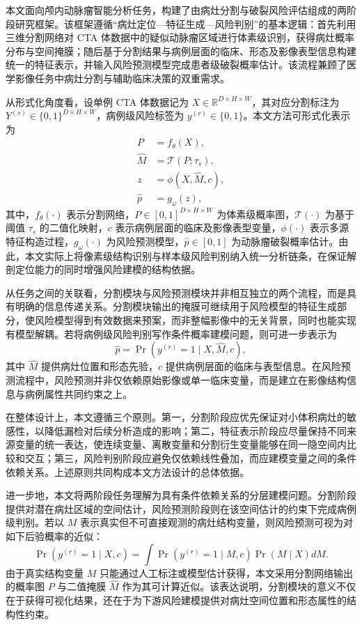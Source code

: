 
本文面向颅内动脉瘤智能分析任务，构建了由病灶分割与破裂风险评估组成的两阶段研究框架。该框架遵循“病灶定位—特征生成—风险判别”的基本逻辑：首先利用三维分割网络对 CTA 体数据中的疑似动脉瘤区域进行体素级识别，获得病灶概率分布与空间掩膜；随后基于分割结果与病例层面的临床、形态及影像表型信息构建统一的特征表示，并输入风险预测模型完成患者级破裂概率估计。该流程兼顾了医学影像任务中病灶分割与辅助临床决策的双重需求。

从形式化角度看，设单例 CTA 体数据记为 $X\in\mathbb{R}^{D\times H\times W}$，其对应分割标注为 $Y^{(s)}\in\{0,1\}^{D\times H\times W}$，病例级风险标签为 $y^{(r)}\in\{0,1\}$。本文方法可形式化表示为
\begin{align}
P &= f_{\theta}(X),\\
\hat{M} &= \mathcal{T}(P;\tau_s),\\
z &= \phi(X,\hat{M},c),\\
\hat{p} &= g_{\omega}(z),
\end{align}
其中，$f_{\theta}(\cdot)$ 表示分割网络，$P\in[0,1]^{D\times H\times W}$ 为体素级概率图，$\mathcal{T}(\cdot)$ 为基于阈值 $\tau_s$ 的二值化映射，$c$ 表示病例层面的临床及影像表型变量，$\phi(\cdot)$ 表示多源特征构造过程，$g_{\omega}(\cdot)$ 为风险预测模型，$\hat{p}\in[0,1]$ 为动脉瘤破裂概率估计。由此，本文实际上将像素级结构识别与样本级风险判别纳入统一分析链条，在保证解剖定位能力的同时增强风险建模的结构依据。

从任务之间的关联看，分割模块与风险预测模块并非相互独立的两个流程，而是具有明确的信息传递关系。分割模块输出的掩膜可继续用于风险模型的特征生成部分，使风险模型得到有效数据来预案，而非整幅影像中的无关背景，同时也能实现有模型解耦。若将病例级风险判别写作条件概率建模问题，则可进一步表示为
\begin{equation}
\hat{p}=\Pr\left(y^{(r)}=1\mid X,\hat{M},c\right),
\end{equation}
其中 $\hat{M}$ 提供病灶位置和形态先验，$c$ 提供病例层面的临床与表型信息。在风险预测流程中，风险预测并非仅依赖原始影像或单一临床变量，而是建立在影像结构信息与病例属性共同约束之上。

在整体设计上，本文遵循三个原则。第一，分割阶段应优先保证对小体积病灶的敏感性，以降低漏检对后续分析造成的影响；第二，特征表示阶段应尽量保持不同来源变量的统一表达，使连续变量、离散变量和分割衍生变量能够在同一隐空间内比较和交互；第三，风险判别阶段应避免仅依赖线性叠加，而应建模变量之间的条件依赖关系。上述原则共同构成本文方法设计的总体依据。

进一步地，本文将两阶段任务理解为具有条件依赖关系的分层建模问题。分割阶段提供对潜在病灶区域的空间估计，风险预测阶段则在该空间估计的约束下完成病例级判别。若以 $M$ 表示真实但不可直接观测的病灶结构变量，则风险预测可视为对如下后验概率的近似：
\begin{equation}
\Pr(y^{(r)}=1\mid X,c)=\int \Pr(y^{(r)}=1\mid M,c)\Pr(M\mid X)dM.
\end{equation}
由于真实结构变量 $M$ 只能通过人工标注或模型估计获得，本文采用分割网络输出的概率图 $P$ 与二值掩膜 $\hat{M}$ 作为其可计算近似。该表达说明，分割模块的意义不仅在于获得可视化结果，还在于为下游风险建模提供对病灶空间位置和形态属性的结构性约束。


